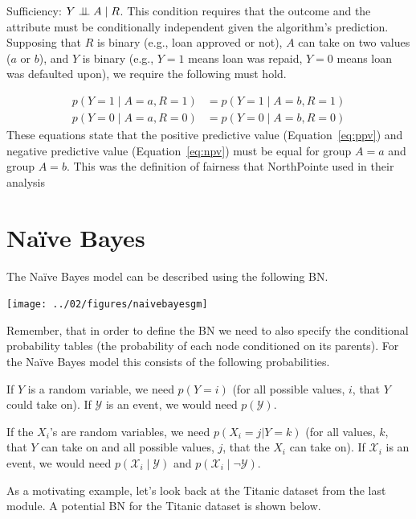 \documentclass[review_Solutions]{subfiles}
\begin{document}
\item Sufficiency: $Y \perp\!\!\!\perp A\mid R$.  This condition requires that the outcome and the attribute must be conditionally independent given the algorithm's prediction.   Supposing that $R$ is binary (e.g., loan approved or not), $A$ can take on two values ($a$ or $b$), and $Y$ is binary (e.g., $Y=1$ means loan was repaid, $Y=0$ means loan was defaulted upon), we require the following must hold.

\begin{align}
p(Y=1 \mid A=a, R=1) &= p(Y=1 \mid A=b, R=1) \label{eq:ppv} \\
p(Y=0 \mid A=a, R=0) &= p(Y=0 \mid A=b, R=0) \label{eq:npv}
\end{align}
These equations state that the positive predictive value (Equation~\ref{eq:ppv}) and negative predictive value (Equation~\ref{eq:npv}) must be equal for group $A=a$ and group $A=b$.  This was the definition of fairness that NorthPointe used in their analysis
\ei

\section{Na\"ive Bayes}

The Na\"ive Bayes model can be described using the following BN.

\begin{center}
\texttt{[image: ../02/figures/naivebayesgm]}
\end{center}

Remember, that in order to define the BN we need to also specify the conditional probability tables (the probability of each node conditioned on its parents).  For the Na\"ive Bayes model this consists of the following probabilities.

\bi
\item If $Y$ is a random variable, we need $p(Y=i)$ (for all possible values, $i$, that $Y$ could take on).  If $\mathcal{Y}$ is an event, we would need $p(\mathcal{Y})$.
\item If the $X_i$'s are random variables, we need $p(X_i=j | Y=k)$ (for all values, $k$, that $Y$ can take on and all possible values, $j$, that the $X_i$ can take on).  If $\mathcal{X}_i$ is an event, we would need $p(\mathcal{X}_i \mid \mathcal{Y})$ and $p(\mathcal{X}_i \mid \neg \mathcal{Y})$.
\ei

As a motivating example, let's look back at the Titanic dataset from the last module.  A potential BN for the Titanic dataset is shown below.
\end{document}
